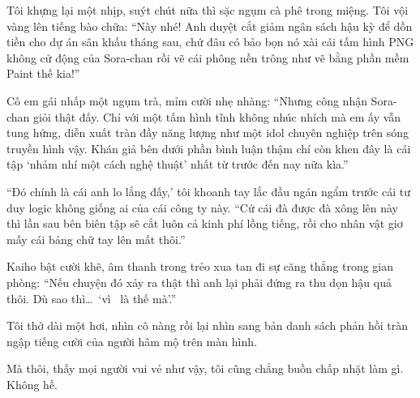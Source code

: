 \documentclass[../main.tex]{subfiles}
\begin{document}
Tôi khựng lại một nhịp, suýt chút nữa thì sặc ngụm cà phê trong miệng. Tôi vội vàng lên tiếng bào chữa: ``Này nhé! Anh duyệt cắt giảm ngân sách hậu kỳ để dồn tiền cho dự án sân khấu tháng sau, chứ đâu có bảo bọn nó xài cái tấm hình PNG không cử động của Sora-chan rồi vẽ cái phông nền trông như vẽ bằng phần mềm Paint thế kia!''

Cô em gái nhấp một ngụm trà, mỉm cười nhẹ nhàng: ``Nhưng công nhận Sora-chan giỏi thật đấy. Chỉ với một tấm hình tĩnh không nhúc nhích mà em ấy vẫn tung hứng, diễn xuất tràn đầy năng lượng như một idol chuyên nghiệp trên sóng truyền hình vậy. Khán giả bên dưới phần bình luận thậm chí còn khen đây là cái tập `nhảm nhí một cách nghệ thuật' nhất từ trước đến nay nữa kìa.''

``Đó chính là cái anh lo lắng đấy,' tôi khoanh tay lắc đầu ngán ngẩm trước cái tư duy logic không giống ai của cái công ty này. ``Cứ cái đà được đà xông lên này thì lần sau bên biên tập sẽ cắt luôn cả kinh phí lồng tiếng, rồi cho nhân vật giơ mấy cái bảng chữ tay lên mất thôi.''

Kaiho bật cười khẽ, âm thanh trong trẻo xua tan đi sự căng thẳng trong gian phòng: ``Nếu chuyện đó xảy ra thật thì anh lại phải đứng ra thu dọn hậu quả thôi. Dù sao thì\dots\ `vì \hll\ là thế mà'.''

Tôi thở dài một hơi, nhìn cô nàng rồi lại nhìn sang bản danh sách phản hồi tràn ngập tiếng cười của người hâm mộ trên màn hình.

Mà thôi, thấy mọi người vui vẻ như vậy, tôi cũng chẳng buồn chấp nhặt làm gì. Không hề.
\end{document}
